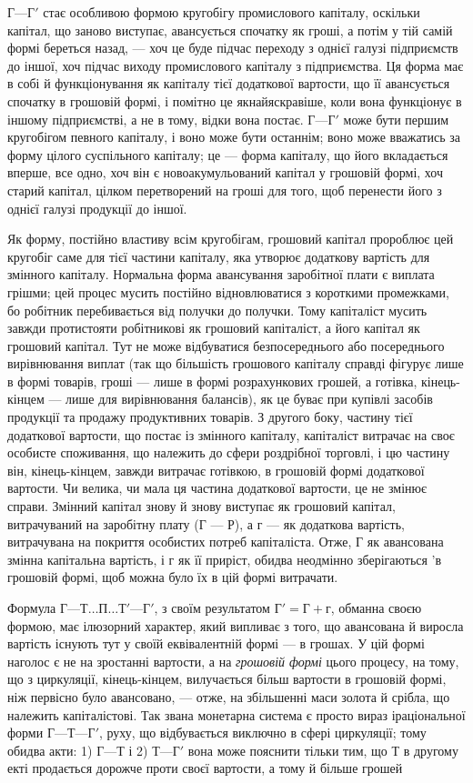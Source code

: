 $Г — Г'$ стає особливою формою кругобігу промислового капіталу,
оскільки капітал, що заново виступає, авансується спочатку як гроші, а потім
у тій самій формі береться назад, — хоч це буде підчас переходу з однієї
галузі підприємств до іншої, хоч підчас виходу промислового капіталу
з підприємства. Ця форма має в собі й функціонування як капіталу
тієї додаткової вартости, що її авансується спочатку в грошовій формі,
і помітно це якнайяскравіше, коли вона функціонує в іншому підприємстві,
а не в тому, відки вона постає. $Г — Г'$ може бути першим кругобігом
певного капіталу, і воно може бути останнім; воно може вважатись за
форму цілого суспільного капіталу; це — форма капіталу, що його вкладається
вперше, все одно, хоч він є новоакумульований капітал у грошовій
формі, хоч старий капітал, цілком перетворений на гроші для того,
щоб перенести його з однієї галузі продукції до іншої.

Як форму, постійно властиву всім кругобігам, грошовий капітал пророблює
цей кругобіг саме для тієї частини капіталу, яка утворює додаткову
вартість для змінного капіталу. Нормальна форма авансування
заробітної плати є виплата грішми; цей процес мусить постійно відновлюватися
з короткими промежками, бо робітник перебивається від
получки до получки. Тому капіталіст мусить завжди протистояти робітникові
як грошовий капіталіст, а його капітал як грошовий капітал. Тут
не може відбуватися безпосереднього або посереднього вирівнювання
виплат (так що більшість грошового капіталу справді фігурує лише
в формі товарів, гроші — лише в формі розрахункових грошей, а готівка,
кінець-кінцем — лише для вирівнювання балансів), як це буває при купівлі
засобів продукції та продажу продуктивних товарів. З другого боку,
частину тієї додаткової вартости, що постає із змінного капіталу, капіталіст
витрачає на своє особисте споживання, що належить до сфери
роздрібної торговлі, і цю частину він, кінець-кінцем, завжди витрачає
готівкою, в грошовій формі додаткової вартости. Чи велика, чи мала ця
частина додаткової вартости, це не змінює справи. Змінний капітал
знову й знову виступає як грошовий капітал, витрачуваний на заробітну
плату (Г — Р), а г — як додаткова вартість, витрачувана на покриття
особистих потреб капіталіста. Отже, Г як авансована змінна капітальна
вартість, і г як її приріст, обидва неодмінно зберігаються 'в грошовій
формі, щоб можна було їх в цій формі витрачати.

Формула $Г — Т\dots{} П\dots{} Т' — Г'$, з своїм результатом $Г' = Г + г$, обманна
своєю формою, має ілюзорний характер, який випливає з того, що
авансована й виросла вартість існують тут у своїй еквівалентній формі — в грошах. У цій формі
наголос є не на зростанні вартости, а на
\emph{грошовій формі} цього процесу, на тому, що з циркуляції, кінець-кінцем,
вилучається більш вартости в грошовій формі, ніж первісно було авансовано, — отже, на збільшенні
маси золота й срібла, що належить капіталістові.
Так звана монетарна система є просто вираз іраціональної форми $Г — Т — Г'$,
руху, що відбувається виключно в сфері циркуляції; тому обидва акти:
1) $Г — Т$ і 2) $Т — Г'$ вона може пояснити тільки тим, що Т в другому
екті продається дорожче проти своєї вартости, а тому й більше грошей
\parbreak{}  %
